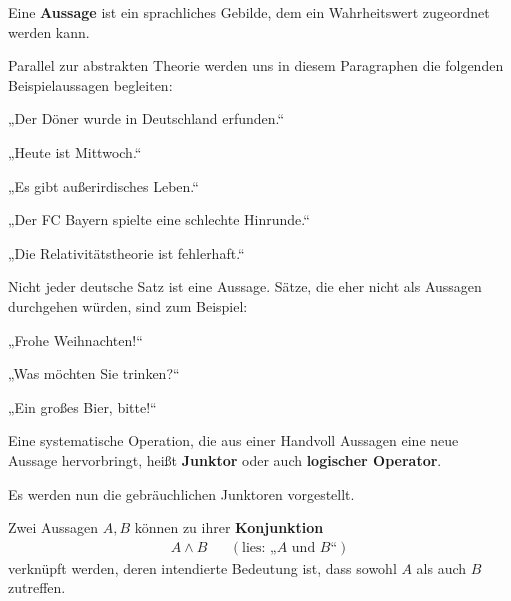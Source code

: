 \begin{defin}[Aussage] \label{def:aussage}
    Eine \textbf{Aussage} ist ein sprachliches Gebilde, dem ein Wahrheitswert zugeordnet werden kann.
\end{defin}
	

\begin{bsp}
    Parallel zur abstrakten Theorie werden uns in diesem Paragraphen die folgenden Beispielaussagen begleiten:
    \begin{labeling}[label={$B_{\arabic*}:=$}, labelindent=1.5em, series=propbsp]
        \item „Der Döner wurde in Deutschland erfunden.“
        \item „Heute ist Mittwoch.“
        \item „Es gibt außerirdisches Leben.“
        \item „Der FC Bayern spielte eine schlechte Hinrunde.“
        \item „Die Relativitätstheorie ist fehlerhaft.“
    \end{labeling}
    Nicht jeder deutsche Satz ist eine Aussage. Sätze, die eher nicht als Aussagen durchgehen würden, sind zum Beispiel: \quad
    \begin{labeling}[resume*=propbsp]
        \item[] „Frohe Weihnachten!“
        \item[] „Was möchten Sie trinken?“
        \item[] „Ein großes Bier, bitte!“
    \end{labeling}
\end{bsp}


\begin{defin}[Junktor] 
    Eine systematische Operation, die aus einer Handvoll Aussagen eine neue Aussage hervorbringt, heißt \textbf{Junktor} oder auch \textbf{logischer Operator}.
\end{defin}


Es werden nun die gebräuchlichen Junktoren vorgestellt.


\begin{defin} 
    Zwei Aussagen $A,B$ können zu ihrer \textbf{Konjunktion}
    \begin{align*}
        A\land B && (\text{lies: „$A$ und $B$“})
    \end{align*}
    verknüpft werden, deren intendierte Bedeutung ist, dass sowohl $A$ als auch $B$ zutreffen.
\end{defin}


